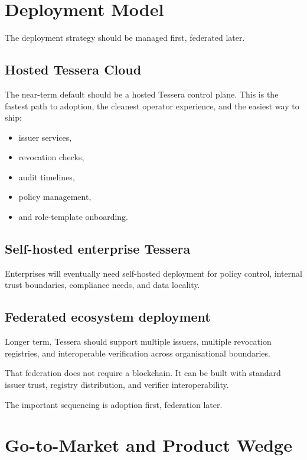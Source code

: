 \documentclass[11pt, a4paper]{article}
\begin{document}
\section{Deployment Model}

The deployment strategy should be managed first, federated later.

\subsection{Hosted Tessera Cloud}

The near-term default should be a hosted Tessera control plane. This is the fastest path to adoption, the cleanest operator experience, and the easiest way to ship:

\begin{itemize}
  \item issuer services,
  \item revocation checks,
  \item audit timelines,
  \item policy management,
  \item and role-template onboarding.
\end{itemize}

\subsection{Self-hosted enterprise Tessera}

Enterprises will eventually need self-hosted deployment for policy control, internal trust boundaries, compliance needs, and data locality.

\subsection{Federated ecosystem deployment}

Longer term, Tessera should support multiple issuers, multiple revocation registries, and interoperable verification across organisational boundaries.

That federation does not require a blockchain. It can be built with standard issuer trust, registry distribution, and verifier interoperability.

The important sequencing is adoption first, federation later.

\section{Go-to-Market and Product Wedge}
\end{document}
